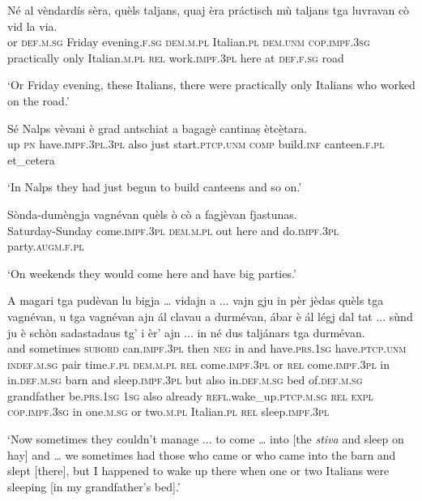 \begin{linenumbers}
\gll Né al vèndardís sèra, quèls taljans, quaj èra práctisch mù taljans tga luvravan cò vid la via. \\
or \textsc{def.m.sg} Friday evening.\textsc{f.sg} \textsc{dem.m.pl} Italian.\textsc{pl} \textsc{dem.unm} \textsc{cop.impf.3sg}  practically only Italian.\textsc{m.pl} \textsc{rel} work.\textsc{impf.3pl} here at \textsc{def.f.sg} road  \\
\end{linenumbers}
\medskip
\glt `Or Friday evening, these Italians, there were practically only Italians who worked on the road.'
\medskip

\begin{linenumbers}
\gll  Sé Nalps vèvani è grad antschiat a bagagè cantinaṣ ètcè̱tara.\\
up \textsc{pn} have.\textsc{impf.3pl.3pl} also just start.\textsc{ptcp.unm} \textsc{comp} build.\textsc{inf} canteen.\textsc{f.pl} et\_cetera\\
\end{linenumbers}
\medskip
\glt `In Nalps they had just begun to build canteens and so on.'
\medskip

\begin{linenumbers}
\gll Sònda-dumèngja vagnévan quèls ò cò a fagjèvan fjastunas.\\
Saturday-Sunday come.\textsc{impf.3pl} \textsc{dem.m.pl} out here and do.\textsc{impf.3pl} party.\textsc{augm.f.pl}\\
\end{linenumbers}
\medskip
\glt `On weekends they would come here and have big parties.'
\medskip

\begin{linenumbers}
\gll A  magari tga pudèvan lu bigja … vidajn a ... vajn gju in pèr jèdas quèls tga vagnévan, u tga vagnévan ajn ál clavau a durmévan, ábar è ál légj dal tat ... sùnd ju è schòn sadastadaus tg' i èr' ajn ... in né dus taljánars tga durmévan.\\
and sometimes  \textsc{subord} can.\textsc{impf.3pl} then \textsc{neg} {} in and {} have.\textsc{prs.1sg} have.\textsc{ptcp.unm} \textsc{indef.m.sg} pair  time.\textsc{f.pl} \textsc{dem.m.pl} \textsc{rel} come.\textsc{impf.3pl} or \textsc{rel} come.\textsc{impf.3pl} in in.\textsc{def.m.sg} barn and sleep.\textsc{impf.3pl} but also in.\textsc{def.m.sg} bed of.\textsc{def.m.sg} grandfather {} be.\textsc{prs.1sg} \textsc{1sg} also already \textsc{refl.}wake\_up.\textsc{ptcp.m.sg} \textsc{rel} \textsc{expl} \textsc{cop.impf.3sg} in {} one.\textsc{m.sg} or two.\textsc{m.pl} Italian.\textsc{pl} \textsc{rel} sleep.\textsc{impf.3pl}  \\
\end{linenumbers}
\medskip
\glt `Now sometimes they couldn’t manage ... to come … into [the \textit{stiva} and sleep on hay] and … we sometimes had those who came or who came into the barn and slept [there], but I happened to wake up there when one or two Italians were sleeping [in my grandfather’s bed].'
\medskip

